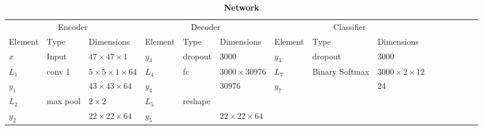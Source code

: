 \begin{landscape}
	\begin{table}[h] {\footnotesize
			\centering
			\caption*{\textbf{Network \networkII}}
			\begin{tabular}{lllllllllllllll}
				\cline{1-9}
				\multicolumn{3}{|c|}{Encoder}                                                                      & \multicolumn{3}{c|}{Decoder}                                                 & \multicolumn{3}{c|}{Classifier}                                                            &  &  &  &  &  &  \\ \cline{1-9}
				\multicolumn{1}{|l|}{Element} & Type     & \multicolumn{1}{l|}{Dimensions}                  & \multicolumn{1}{l|}{Element} & Type     & \multicolumn{1}{l|}{Dimensions}                  & \multicolumn{1}{l|}{Element} & Type           & \multicolumn{1}{l|}{Dimensions}            &   &   &   &   &                             &   \\ \cline{1-9}
				\multicolumn{1}{|l|}{$x$}     & Input    & \multicolumn{1}{l|}{$47\times 47 \times 1$}      & \multicolumn{1}{l|}{$y_3$}   & dropout  & \multicolumn{1}{l|}{3000}                        & \multicolumn{1}{l|}{$y_3$}   & dropout        & \multicolumn{1}{l|}{3000}                  &   &   &   &   &                             &   \\ \cline{1-9}
				\multicolumn{1}{|l|}{$L_1$}   & conv 1   & \multicolumn{1}{l|}{$5\times 5\times1\times 64$} & \multicolumn{1}{l|}{$L_4$}   & fc       & \multicolumn{1}{l|}{$3000\times30976$}           & \multicolumn{1}{l|}{$L_7$}   & Binary Softmax & \multicolumn{1}{l|}{$3000\times2\times12$} &   &   &   &   &                             &   \\
				\multicolumn{1}{|l|}{$y_1$}   &          & \multicolumn{1}{l|}{$43\times43\times64$}        & \multicolumn{1}{l|}{$y_4$}   &          & \multicolumn{1}{l|}{$30976$}                     & \multicolumn{1}{l|}{$y_7$}   &                & \multicolumn{1}{l|}{24}                    &   &   &   &   &                             &   \\ \cline{1-9}
				\multicolumn{1}{|l|}{$L_2$}   & max pool & \multicolumn{1}{l|}{$2\times 2$}                 & \multicolumn{1}{l|}{$L_5$}   & reshape  & \multicolumn{1}{l|}{}                            &                              &                & \multicolumn{1}{l}{}                       &   &   &   &   &                             &   \\
				\multicolumn{1}{|l|}{$y_2$}   &          & \multicolumn{1}{l|}{$22\times22\times 64$}       & \multicolumn{1}{l|}{$y_5$}   &          & \multicolumn{1}{l|}{$22\times22\times64$}        &                              &                & \multicolumn{1}{l}{}                       &   &   &   &   &                             &   \\ \cline{1-6}

\end{tabular}}
\end{table}
\end{landscape}
